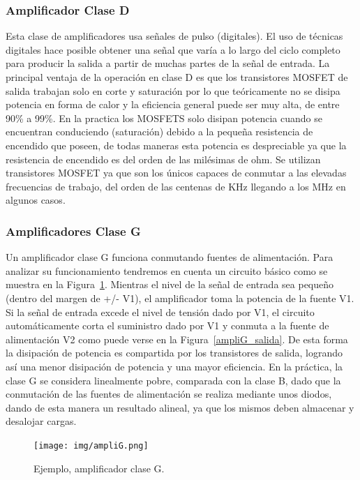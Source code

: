 \documentclass[a4paper,12pt,twoside]{article}
\begin{document}
\medskip 
\subsubsection*{Amplificador Clase D}

Esta clase de amplificadores usa señales de pulso (digitales). El uso de técnicas digitales hace posible obtener una señal que varía a lo largo del ciclo completo para producir la salida a partir de muchas partes de la señal de entrada. La principal ventaja de la operación en clase D es que los transistores MOSFET de salida trabajan solo en corte y saturación por lo que teóricamente no se disipa potencia en forma de calor y la eficiencia general puede ser muy alta, de entre 90\% a 99\%. En la practica los MOSFETS solo disipan potencia cuando se encuentran conduciendo (saturación) debido a la pequeña resistencia de encendido que poseen, de todas maneras esta potencia es despreciable ya que la resistencia de encendido es del orden de las milésimas de ohm. Se utilizan transistores MOSFET ya que son los únicos capaces de conmutar a las elevadas frecuencias de trabajo, del orden de las centenas de KHz llegando a los MHz en algunos casos.

\newpage

\subsubsection*{Amplificadores Clase G}

Un amplificador clase G funciona conmutando fuentes de alimentación. Para analizar su funcionamiento tendremos en cuenta un circuito básico como se muestra en la Figura~\ref{ampliG}. Mientras el nivel de la señal de entrada sea pequeño (dentro del margen de +/- V1), el amplificador toma la potencia de la fuente V1. Si la señal de entrada excede el nivel de tensión dado por V1, el circuito automáticamente corta el suministro dado por V1 y conmuta a la fuente de alimentación V2 como puede verse en la Figura~\ref{ampliG_salida}. De esta forma la disipación de potencia es compartida por los transistores de salida, logrando así una menor disipación de potencia y una mayor eficiencia.
En la práctica, la clase G se considera linealmente pobre, comparada con la clase B, dado que la conmutación de las fuentes de alimentación se realiza mediante unos diodos, dando de esta manera un resultado alineal, ya que los mismos deben almacenar y desalojar cargas.
 
\begin{figure}[H]
 \centering
 \texttt{[image: img/ampliG.png]}
 \caption{Ejemplo, amplificador clase G.}
 \label{ampliG} 
 \end{figure}
  
\end{document}
